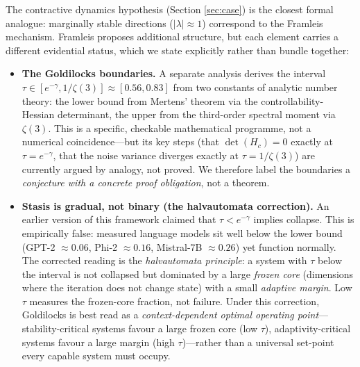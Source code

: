 \documentclass[11pt,a4paper]{article}
\theoremstyle{definition}
\begin{document}
The contractive dynamics hypothesis (Section \ref{sec:case}) is the closest formal
analogue: marginally stable directions ($|\lambda| \approx 1$) correspond to the
Framleis mechanism. Framleis proposes additional structure, but each element carries
a different evidential status, which we state explicitly rather than bundle together:

\begin{itemize}
    \item \textbf{The Goldilocks boundaries.} A separate analysis derives the interval
    $\tau \in [e^{-\gamma}, 1/\zeta(3)] \approx [0.56, 0.83]$ from two constants of
    analytic number theory: the lower bound from Mertens' theorem via the
    controllability-Hessian determinant, the upper from the third-order spectral
    moment via $\zeta(3)$. This is a specific, checkable mathematical programme, not
    a numerical coincidence---but its key steps (that $\det(H_c) = 0$ exactly at
    $\tau = e^{-\gamma}$, that the noise variance diverges exactly at $\tau = 1/\zeta(3)$)
    are currently argued by analogy, not proved. We therefore label the boundaries a
    \emph{conjecture with a concrete proof obligation}, not a theorem.

    \item \textbf{Stasis is gradual, not binary (the halvautomata correction).} An
    earlier version of this framework claimed that $\tau < e^{-\gamma}$ implies
    collapse. This is empirically false: measured language models sit well below the
    lower bound (GPT-2 $\approx 0.06$, Phi-2 $\approx 0.16$, Mistral-7B $\approx 0.26$)
    yet function normally. The corrected reading is the \emph{halvautomata principle}:
    a system with $\tau$ below the interval is not collapsed but dominated by a large
    \emph{frozen core} (dimensions where the iteration does not change state) with a
    small \emph{adaptive margin}. Low $\tau$ measures the frozen-core fraction, not
    failure. Under this correction, Goldilocks is best read as a \emph{context-dependent
    optimal operating point}---stability-critical systems favour a large frozen core
    (low $\tau$), adaptivity-critical systems favour a large margin (high $\tau$)---rather
    than a universal set-point every capable system must occupy.
\end{itemize}
\end{document}
